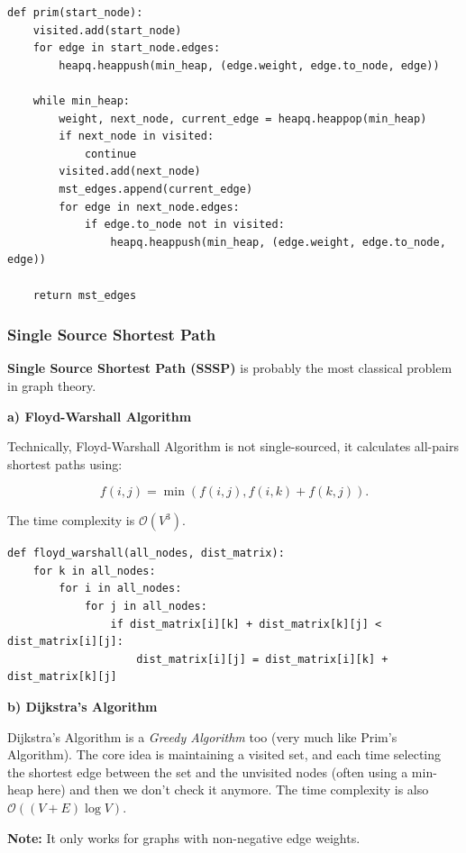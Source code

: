 \documentclass{article}
\begin{document}
\begin{lstlisting}[style=python]
def prim(start_node):
    visited.add(start_node)
    for edge in start_node.edges:
        heapq.heappush(min_heap, (edge.weight, edge.to_node, edge))
        
    while min_heap:
        weight, next_node, current_edge = heapq.heappop(min_heap)
        if next_node in visited:
            continue
        visited.add(next_node)
        mst_edges.append(current_edge)
        for edge in next_node.edges:
            if edge.to_node not in visited:
                heapq.heappush(min_heap, (edge.weight, edge.to_node, edge))
                
    return mst_edges
\end{lstlisting}

\subsubsection{Single Source Shortest Path}

\textbf{Single Source Shortest Path (SSSP)} is probably the most classical problem in graph theory.

\textbf{a) Floyd-Warshall Algorithm}

Technically, Floyd-Warshall Algorithm is not single-sourced, it calculates all-pairs shortest paths using:

$$
f(i,j)=\min(f(i,j),f(i,k) + f(k,j)).
$$

The time complexity is $\mathcal O(V^3)$.

\begin{lstlisting}[style=python]
def floyd_warshall(all_nodes, dist_matrix):
    for k in all_nodes:
        for i in all_nodes:
            for j in all_nodes:
                if dist_matrix[i][k] + dist_matrix[k][j] < dist_matrix[i][j]:
                    dist_matrix[i][j] = dist_matrix[i][k] + dist_matrix[k][j]
\end{lstlisting}

\textbf{b) Dijkstra's Algorithm}

Dijkstra's Algorithm is a \emph{Greedy Algorithm} too (very much like Prim's Algorithm). The core idea is maintaining a visited set, and each time selecting the shortest edge between the set and the unvisited nodes (often using a min-heap here) and then we don't check it anymore. The time complexity is also $\mathcal O((V+E)\log V)$.

\textbf{Note:} It only works for graphs with non-negative edge weights.
\end{document}
